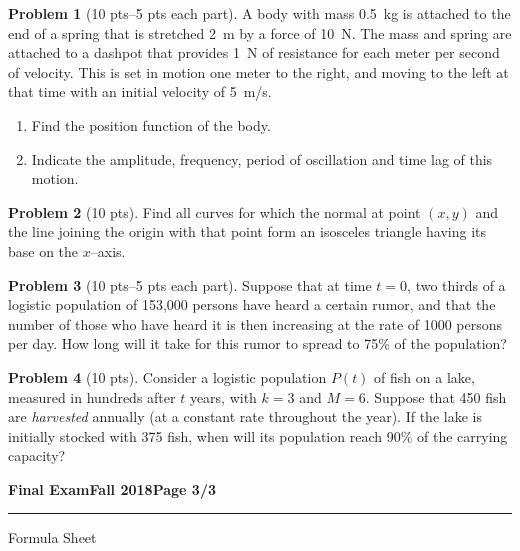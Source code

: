 \documentclass[12pt]{article}
\theoremstyle{definition}
\newtheorem{problem}{Problem}
\begin{document}
\begin{problem}[10 pts--5 pts each part]
A body with mass 0.5~kg is attached to the end of a spring that is stretched 2~m by a force of 10~N.  The mass and spring are attached to a dashpot that provides 1~N of resistance for each meter per second of velocity.  This is set in motion one meter to the right, and moving to the left at that time with an initial velocity of 5~m/s.
\begin{enumerate}
  \item Find the position function of the body.
  \item Indicate the amplitude, frequency, period of oscillation and time lag of this motion.
\end{enumerate}
\end{problem}

\begin{problem}[10 pts]
Find all curves for which the normal at point $(x,y)$ and the line joining the origin with that point form an isosceles triangle having its base on the $x$--axis.
\end{problem}

\begin{problem}[10 pts--5 pts each part]
Suppose that at time $t=0$, two thirds of a logistic population of 153,000 persons have heard a certain rumor, and that the number of those who have heard it is then increasing­ at the rate of 1000 persons per day. How long will it take for this rumor to spread to 75\% of the population?
\end{problem}

\begin{problem}[10 pts]
Consider a logistic population $P(t)$ of fish on a lake, measured in hundreds after $t$ years, with $k=3$ and $M=6$.  Suppose that 450 fish are \emph{harvested} annually (at a constant rate throughout the year).  If the lake is initially stocked with 375 fish, when will its population reach 90\% of the carrying capacity?
\end{problem}

\newpage

\hfill{\large\bf Final Exam}\hfill{\large\bf Fall 2018}\hfill{\large\bf Page 3/3}\hrule

\bigskip
{\Large Formula Sheet}
\end{document}
